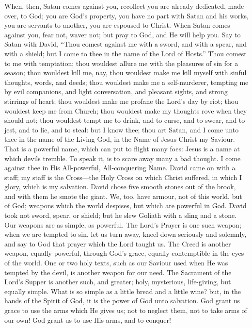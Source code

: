 When, then, Satan comes against you, recollect you are already
dedicated, made over, to God; you are God's property, you have no part
with Satan and his works, you are servants to another, you are
espoused to Christ. When Satan comes against you, fear not, waver not;
but pray to God, and He will help you. Say to Satan with David,
``Thou comest against me with a sword, and with a spear, and with
a shield; but I come to thee in the name of the Lord of Hosts.''
Thou comest to me with temptation; thou wouldest allure me with the
pleasures of sin for a season; thou wouldest kill me, nay, thou
wouldest make me kill myself with sinful thoughts, words, and deeds;
thou wouldest make me a self-murderer, tempting me by evil companions,
and light conversation, and pleasant sights, and strong stirrings of
heart; thou wouldest make me profane the Lord's day by riot; thou
wouldest keep me from Church; thou wouldest make my thoughts rove when
they should not; thou wouldest tempt me to drink, and to curse, and to
swear, and to jest, and to lie, and to steal: but I know thee; thou
art Satan, and I come unto thee in the name of the Living God, in the
Name of Jesus Christ my Saviour. That is a powerful name, which can
put to flight many foes: Jesus is a name at which devils tremble. To
speak it, is to scare away many a bad thought. I come against thee in
His All-powerful, All-conquering Name. David came on with a staff; my
staff is the Cross—the Holy Cross on which Christ suffered, in which
I glory, which is my salvation. David chose five smooth stones out of
the brook, and with them he smote the giant. We, too, have armour, not
of this world, but of God; weapons which the world despises, but which
are powerful in God. David took not sword, spear, or shield; but he
slew Goliath with a sling and a stone. Our weapons are as simple, as
powerful. The Lord's Prayer is one such weapon; when we are tempted to
sin, let us turn away, kneel down seriously and solemnly, and say to
God that prayer which the Lord taught us. The Creed is another weapon,
equally powerful, through God's grace, equally contemptible in the
eyes of the world. One or two holy texts, such as our Saviour used
when He was tempted by the devil, is another weapon for our need. The
Sacrament of the Lord's Supper is another such, and greater; holy,
mysterious, life-giving, but equally simple. What is so simple as a
little bread and a little wine? but, in the hands of the Spirit of
God, it is the power of God unto salvation. God grant us grace to use
the arms which He gives us; not to neglect them, not to take arms of
our own! God grant us to use His arms, and to conquer!

